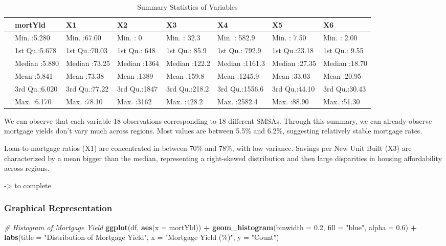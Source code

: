 \documentclass[
  12pt,
]{article}
\newenvironment{Shaded}{\begin{snugshade}}{\end{snugshade}}
\newcommand{\AttributeTok}[1]{\textcolor[rgb]{0.13,0.29,0.53}{#1}}
\newcommand{\CommentTok}[1]{\textcolor[rgb]{0.56,0.35,0.01}{\textit{#1}}}
\newcommand{\FloatTok}[1]{\textcolor[rgb]{0.00,0.00,0.81}{#1}}
\newcommand{\FunctionTok}[1]{\textcolor[rgb]{0.13,0.29,0.53}{\textbf{#1}}}
\newcommand{\NormalTok}[1]{#1}
\newcommand{\SpecialCharTok}[1]{\textcolor[rgb]{0.81,0.36,0.00}{\textbf{#1}}}
\newcommand{\StringTok}[1]{\textcolor[rgb]{0.31,0.60,0.02}{#1}}
\begin{document}
\begin{longtable}[t]{llllllll}
\caption{\label{tab:unnamed-chunk-3}Summary Statistics of Variables}\\
\toprule
 & mortYld & X1 & X2 & X3 & X4 & X5 & X6\\
\midrule
 & Min.   :5.280 & Min.   :67.00 & Min.   :   0 & Min.   : 32.3 & Min.   : 582.9 & Min.   : 7.50 & Min.   : 2.00\\
 & 1st Qu.:5.678 & 1st Qu.:70.03 & 1st Qu.: 648 & 1st Qu.: 85.9 & 1st Qu.: 792.9 & 1st Qu.:23.18 & 1st Qu.: 9.55\\
 & Median :5.880 & Median :73.25 & Median :1364 & Median :122.2 & Median :1161.3 & Median :27.35 & Median :18.70\\
 & Mean   :5.841 & Mean   :73.38 & Mean   :1389 & Mean   :159.8 & Mean   :1245.9 & Mean   :33.03 & Mean   :20.95\\
 & 3rd Qu.:6.020 & 3rd Qu.:77.22 & 3rd Qu.:1847 & 3rd Qu.:218.2 & 3rd Qu.:1556.6 & 3rd Qu.:44.10 & 3rd Qu.:30.43\\
\addlinespace
 & Max.   :6.170 & Max.   :78.10 & Max.   :3162 & Max.   :428.2 & Max.   :2582.4 & Max.   :88.90 & Max.   :51.30\\
\bottomrule
\end{longtable}

We can observe that each variable 18 observations corresponding to 18
different SMSAs. Through this summary, we can already observe mortgage
yields don't vary much across regions. Most values are between 5.5\% and
6.2\%, suggesting relatively stable mortgage rates.

Loan-to-mortgage ratios (X1) are concentrated in between 70\% and 78\%,
with low variance. Savings per New Unit Built (X3) are characterized by
a mean bigger than the median, representing a right-skewed distribution
and then large disparities in housing affordability across regions.

-\textgreater{} to complete

\subsubsection{Graphical Representation}\label{graphical-representation}

\begin{Shaded}
\begin{Highlighting}[]
\CommentTok{\# Histogram of Mortgage Yield}
\FunctionTok{ggplot}\NormalTok{(df, }\FunctionTok{aes}\NormalTok{(}\AttributeTok{x =}\NormalTok{ mortYld)) }\SpecialCharTok{+} 
  \FunctionTok{geom\_histogram}\NormalTok{(}\AttributeTok{binwidth =} \FloatTok{0.2}\NormalTok{, }\AttributeTok{fill =} \StringTok{"blue"}\NormalTok{, }\AttributeTok{alpha =} \FloatTok{0.6}\NormalTok{) }\SpecialCharTok{+}
  \FunctionTok{labs}\NormalTok{(}\AttributeTok{title =} \StringTok{"Distribution of Mortgage Yield"}\NormalTok{, }\AttributeTok{x =} \StringTok{"Mortgage Yield (\%)"}\NormalTok{, }\AttributeTok{y =} \StringTok{"Count"}\NormalTok{)}
\end{Highlighting}
\end{Shaded}
\end{document}
